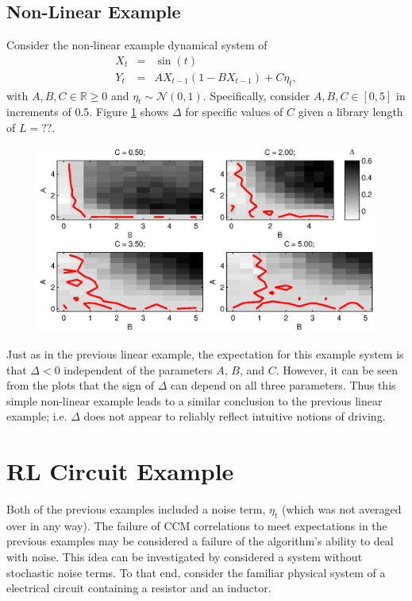 \documentclass[a4paper,11pt,twocolumn]{article}
\begin{document}
\subsection{Non-Linear Example}
Consider the non-linear example dynamical system of
\begin{eqnarray}
\label{eqn:nonlinearEX}
X_t &=& \sin(t)\\
Y_t &=& AX_{t-1}\left(1-BX_{t-1}\right)+C\eta_t,
\end{eqnarray}
with $A,B,C\in\mathbb{R}\ge 0$ and $\eta_t\sim\mathcal{N}\left(0,1\right)$.  Specifically, consider $A,B,C\in[0,5]$ in increments of 0.5.  Figure \ref{fig:nonlinearex} shows $\Delta$ for specific values of $C$ given a library length of $L=??$.
\begin{figure}[ht]
\includegraphics[scale=0.55]{NonLinearEx.eps} \\
\caption{}
\label{fig:nonlinearex}
\end{figure}
Just as in the previous linear example, the expectation for this example system is that $\Delta<0$ independent of the parameters $A$, $B$, and $C$.  However, it can be seen from the plots that the sign of $\Delta$ can depend on all three parameters.  Thus this simple non-linear example leads to a similar conclusion to the previous linear example; i.e. $\Delta$ does not appear to reliably reflect intuitive notions of driving.

\section{RL Circuit Example}
\label{sec:rlcirc}
Both of the previous examples included a noise term, $\eta_t$ (which was not averaged over in any way).  The failure of CCM correlations to meet expectations in the previous examples may be considered a failure of the algorithm's ability to deal with noise.  This idea can be investigated by considered a system without stochastic noise terms.  To that end, consider the familiar physical system of a electrical circuit containing a resistor and an inductor.
\end{document}
